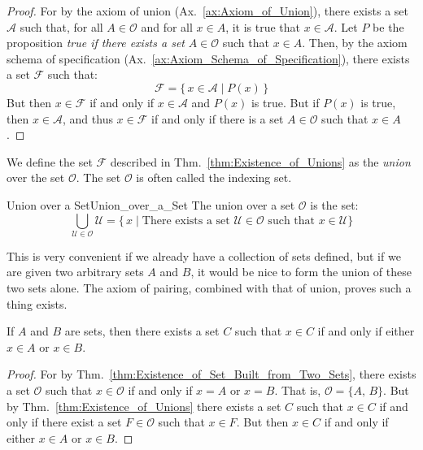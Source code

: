         \begin{proof}
            For by the axiom of union (Ax.~\ref{ax:Axiom_of_Union}), there
            exists a set $\mathcal{A}$ such that, for all $A\in\mathcal{O}$
            and for all $x\in{A}$, it is true that $x\in\mathcal{A}$. Let
            $P$ be the proposition \textit{true if there exists a set}
            $A\in\mathcal{O}$ such that $x\in{A}$. Then, by the axiom schema
            of specification (Ax.~\ref{ax:Axiom_Schema_of_Specification}),
            there exists a set $\mathcal{F}$ such that:
            \begin{equation}
                \mathcal{F}=\{\,x\in\mathcal{A}\;|\;P(x)\,\}
            \end{equation}
            But then $x\in\mathcal{F}$ if and only if $x\in\mathcal{A}$ and
            $P(x)$ is true. But if $P(x)$ is true, then $x\in\mathcal{A}$, and
            thus $x\in\mathcal{F}$ if and only if there is a set
            $A\in\mathcal{O}$ such that $x\in{A}$.
        \end{proof}
        We define the set $\mathcal{F}$ described in
        Thm.~\ref{thm:Existence_of_Unions} as the \textit{union} over the set
        $\mathcal{O}$. The set $\mathcal{O}$ is often called the indexing set.
        \begin{fdefinition}{Union over a Set}{Union_over_a_Set}
            The \gls{union over a set} $\mathcal{O}$ is the set:
            \begin{equation*}
                \bigcup_{\mathcal{U}\in\mathcal{O}}\mathcal{U}
                =\big\{\,x\;|\;\textrm{There exists a set }
                         \mathcal{U}\in\mathcal{O}\textrm{ such that }
                         x\in\mathcal{U}\big\}
            \end{equation*}
        \end{fdefinition}
        This is very convenient if we already have a collection of sets
        defined, but if we are given two arbitrary sets $A$ and $B$, it would
        be nice to form the union of these two sets alone. The axiom of
        pairing, combined with that of union, proves such a thing exists.
        \begin{theorem}
            \label{thm:Union_of_Two_Sets_Exists}%
            If $A$ and $B$ are sets, then there exists a set $C$ such that
            $x\in{C}$ if and only if either $x\in{A}$ or $x\in{B}$.
        \end{theorem}
        \begin{proof}
            For by Thm.~\ref{thm:Existence_of_Set_Built_from_Two_Sets},
            there exists a set $\mathcal{O}$ such that $x\in\mathcal{O}$ if and
            only if $x=A$ or $x=B$. That is, $\mathcal{O}=\{A,\,B\}$.
            But by Thm.~\ref{thm:Existence_of_Unions} there exists a set
            $C$ such that $x\in{C}$ if and only if there exist a set
            $F\in\mathcal{O}$ such that $x\in{F}$. But then $x\in{C}$ if and
            only if either $x\in{A}$ or $x\in{B}$.
        \end{proof}
